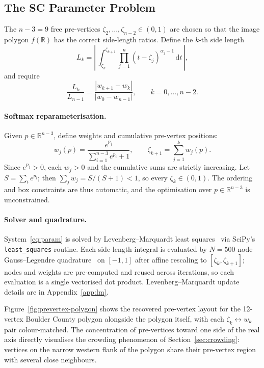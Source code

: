\documentclass[11pt]{article}
\newcommand{\RR}{\mathbb{R}}
\newcommand{\dif}{\,\mathrm{d}}
\newcommand{\abs}[1]{\left\lvert #1 \right\rvert}
\begin{document}
\subsection{The SC Parameter Problem}
\label{sec:param}

The $n - 3 = 9$ free pre-vertices $\zeta_2, \dots, \zeta_{n-2} \in (0, 1)$
are chosen so that the image polygon $f(\RR)$ has the correct side-length
ratios. Define the $k$-th side length
\begin{equation}
  L_k = \abs{\, \int_{\zeta_k}^{\zeta_{k+1}}
    \prod_{j=1}^{n} (t - \zeta_j)^{\alpha_j - 1} \dif t \,},
\end{equation}
and require
\begin{equation}
  \frac{L_k}{L_{n-1}}
  = \frac{\abs{w_{k+1} - w_k}}{\abs{w_0 - w_{n-1}}},
  \qquad k = 0, \dots, n - 2.
  \label{eq:param}
\end{equation}

\paragraph{Softmax reparameterisation.}
Given $p \in \RR^{n-3}$, define weights and cumulative pre-vertex positions:
\begin{equation}
  w_j(p) = \frac{e^{p_j}}{\displaystyle\sum_{i=1}^{n-3} e^{p_i} + 1},
  \qquad
  \zeta_{k+1} = \sum_{j=1}^{k} w_j(p).
  \label{eq:softmax}
\end{equation}
Since $e^{p_j} > 0$, each $w_j > 0$ and the cumulative sums are strictly
increasing. Let $S = \sum_i e^{p_i}$; then $\sum_j w_j = S/(S + 1) < 1$, so
every $\zeta_k \in (0, 1)$. The ordering and box constraints are thus
automatic, and the optimisation over $p \in \RR^{n-3}$ is unconstrained.

\paragraph{Solver and quadrature.}
System~\eqref{eq:param} is solved by Levenberg--Marquardt least squares~\citep[Ch.~7]{SB02} via
SciPy's \texttt{least\_squares} routine. Each side-length integral is
evaluated by $N = 500$-node Gauss--Legendre quadrature~\citep[\S3.5(v)]{NIST10}\citep{DB08} on $[-1, 1]$ after
affine rescaling to $[\zeta_k, \zeta_{k+1}]$; nodes and weights are
pre-computed and reused across iterations, so each evaluation is a single
vectorised dot product. Levenberg--Marquardt update details are in
Appendix~\ref{app:lm}.

Figure~\ref{fig:prevertex-polygon} shows the recovered pre-vertex layout for
the 12-vertex Boulder County polygon alongside the polygon itself, with each
$\zeta_k \leftrightarrow w_k$ pair colour-matched. The concentration of
pre-vertices toward one side of the real axis directly visualises the
crowding phenomenon of Section~\ref{sec:crowding}: vertices on the narrow
western flank of the polygon share their pre-vertex region with several
close neighbours.
\end{document}
